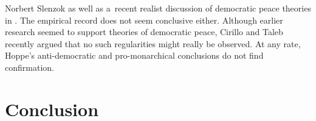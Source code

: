 \begin{artengenv}{Norbert Slenzok}
{%
 \parencite*[][pp.232–237]{hoppe_great_2021} as well as a~recent realist discussion of democratic peace theories in
 \parencite{mearsheimer_great_2018}.
 The empirical record does not seem conclusive either. Although earlier research
 \parencites{pinker_better_2012}{rummel_libertarianism_1983}
 seemed to support theories of democratic peace, Cirillo and Taleb recently
 \parencite*{cirillo_statistical_2015}
 argued that no such regularities might really be observed. At any rate, Hoppe's anti-democratic and pro-monarchical conclusions do not find confirmation.}



\section{Conclusion}


\end{artengenv}
